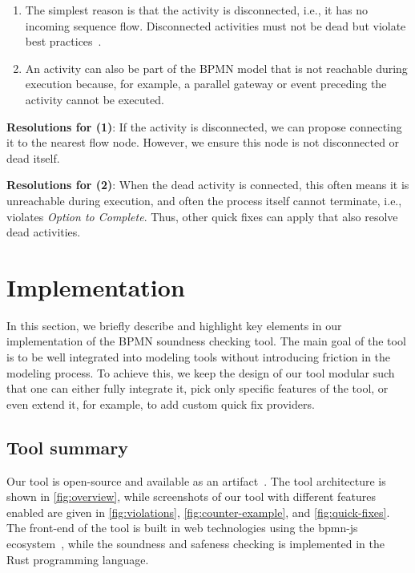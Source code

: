 \documentclass[runningheads]{llncs}
\begin{document}
\begin{enumerate}
	\item The simplest reason is that the activity is disconnected, i.e., it has no incoming sequence flow.
	Disconnected activities must not be dead but violate best practices~\cite{camundaservicesgmbhBpmnlint2024}.
	\item An activity can also be part of the BPMN model that is not reachable during execution because, for example, a parallel gateway or event preceding the activity cannot be executed.
\end{enumerate}

\textbf{Resolutions for (1)}: If the activity is disconnected, we can propose connecting it to the nearest flow node.
However, we ensure this node is not disconnected or dead itself.

\textbf{Resolutions for (2)}: When the dead activity is connected, this often means it is unreachable during execution, and often the process itself cannot terminate, i.e., violates \textit{Option to Complete}.
Thus, other quick fixes can apply that also resolve dead activities.

\section{Implementation}

In this section, we briefly describe and highlight key elements in our implementation of the BPMN soundness checking tool.
The main goal of the tool is to be well integrated into modeling tools without introducing friction in the modeling process.
To achieve this, we keep the design of our tool modular such that one can either fully integrate it, pick only specific features of the tool, or even extend it, for example, to add custom quick fix providers.

\subsection{Tool summary}
Our tool is open-source and available as an artifact~\cite{noauthorgivenBPM2024Artifacts2024}.
The tool architecture is shown in \autoref{fig:overview}, while screenshots of our tool with different features enabled are given in \autoref{fig:violations}, \autoref{fig:counter-example}, and \autoref{fig:quick-fixes}.
The front-end of the tool is built in web technologies using the bpmn-js ecosystem~\cite{camundaservicesgmbhBpmnjsTokenSimulation2024}, while the soundness and safeness checking is implemented in the Rust programming language.
\end{document}
